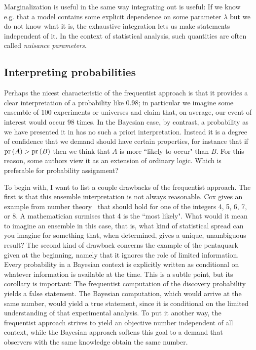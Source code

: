 Marginalization is useful in the same way integrating out is useful: If we know
e.g. that a model contains some explicit dependence on some parameter $\lambda$
but we do not know what it is, the exhaustive integration lets us make statements
independent of it. In the context of statistical analysis, such quantities are
often called {\it nuisance parameters}.

\subsection{Interpreting probabilities}

Perhaps the nicest characteristic of the frequentist approach is that it
provides a clear interpretation of a probability like 0.98; in particular we
imagine some ensemble of 100 experiments or universes and claim that, on
average, our event of interest would occur 98 times. In the Bayesian case, by
contrast, a probability as we have presented it in
 has no such a priori interpretation. Instead it
is a degree of confidence that we demand should have certain properties, for
instance that if $\operatorname{pr}\left(A\right)>\operatorname{pr}\left(B\right)$ then we think that $A$ is more ``likely to
occur" than $B$. For this reason, some authors view it as an extension of
ordinary logic. Which is preferable for probability assignment?

To begin with, I want to list a couple drawbacks of the frequentist approach.
The first is that this ensemble interpretation is not always reasonable. Cox
gives an example from number theory~\cite{cox_probability_1946} that should hold
for one of the integers 4, 5, 6, 7, or 8. A mathematician surmises that
4 is the ``most likely". What would it mean to imagine an ensemble in this case,
that is, what kind of statistical spread can you imagine for something that,
when determined, gives a unique, unambiguous result?
The second kind of drawback concerns the example of the pentaquark given at the
beginning, namely that it ignores the role of limited information. Every
probability in a Bayesian context is explicitly written as conditional on
whatever information is available at the time. This is a subtle point, but its
corollary is important: The frequentist computation of the discovery probability 
yields a false statement. The Bayesian computation, which would arrive at the same 
number, would yield a true statement, since it is conditional on the limited
understanding of that experimental analysis. To put it another way, the
frequentist approach strives to yield an objective number independent of all
context, while the Bayesian approach softens this goal to a demand that
observers with the same knowledge obtain the same number.

